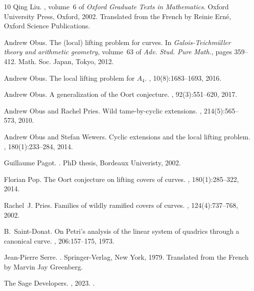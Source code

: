 \documentclass[11pt,letterpaper]{amsart}
\theoremstyle{definition}
\begin{document}
{\begin{thebibliography}{10}
Qing Liu.
, volume~6 of {\em
  Oxford Graduate Texts in Mathematics}.
\newblock Oxford University Press, Oxford, 2002.
\newblock Translated from the French by Reinie Ern\'e, Oxford Science
  Publications.

Andrew Obus.
\newblock The (local) lifting problem for curves.
\newblock In {\em Galois-{T}eichm\"uller theory and arithmetic geometry},
  volume~63 of {\em Adv. Stud. Pure Math.}, pages 359--412. Math. Soc. Japan,
  Tokyo, 2012.

Andrew Obus.
\newblock The local lifting problem for {$A_4$}.
, 10(8):1683--1693, 2016.

Andrew Obus.
\newblock A generalization of the {O}ort conjecture.
, 92(3):551--620, 2017.

Andrew Obus and Rachel Pries.
\newblock Wild tame-by-cyclic extensions.
, 214(5):565--573, 2010.

Andrew Obus and Stefan Wewers.
\newblock Cyclic extensions and the local lifting problem.
, 180(1):233--284, 2014.

Guillaume Pagot.
.
\newblock PhD thesis, Bordeaux Univeristy, 2002.

Florian Pop.
\newblock The {O}ort conjecture on lifting covers of curves.
, 180(1):285--322, 2014.

Rachel~J. Pries.
\newblock Families of wildly ramified covers of curves.
, 124(4):737--768, 2002.

B.~Saint-Donat.
\newblock On {P}etri's analysis of the linear system of quadrics through a
  canonical curve.
, 206:157--175, 1973.

Jean-Pierre Serre.
.
\newblock Springer-Verlag, New York, 1979.
\newblock Translated from the French by Marvin Jay Greenberg.
  
{The Sage Developers}.
, 2023.
.


\end{thebibliography}}
\end{document}
